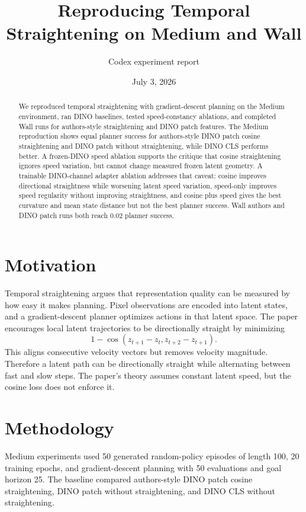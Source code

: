 \documentclass[11pt]{article}
\title{Reproducing Temporal Straightening on Medium and Wall}
\author{Codex experiment report}
\date{July 3, 2026}
\begin{document}
\maketitle

\begin{abstract}
We reproduced temporal straightening with gradient-descent planning on the Medium environment, ran DINO baselines, tested speed-constancy ablations, and completed Wall runs for authors-style straightening and DINO patch features. The Medium reproduction shows equal planner success for authors-style DINO patch cosine straightening and DINO patch without straightening, while DINO CLS performs better. A frozen-DINO speed ablation supports the critique that cosine straightening ignores speed variation, but cannot change measured frozen latent geometry. A trainable DINO-channel adapter ablation addresses that caveat: cosine improves directional straightness while worsening latent speed variation, speed-only improves speed regularity without improving straightness, and cosine plus speed gives the best curvature and mean state distance but not the best planner success. Wall authors and DINO patch runs both reach 0.02 planner success.
\end{abstract}

\section{Motivation}

Temporal straightening argues that representation quality can be measured by how easy it makes planning. Pixel observations are encoded into latent states, and a gradient-descent planner optimizes actions in that latent space. The paper encourages local latent trajectories to be directionally straight by minimizing
\[
  1 - \cos(z_{t+1} - z_t, z_{t+2} - z_{t+1}).
\]
This aligns consecutive velocity vectors but removes velocity magnitude. Therefore a latent path can be directionally straight while alternating between fast and slow steps. The paper's theory assumes constant latent speed, but the cosine loss does not enforce it.

\section{Methodology}

Medium experiments used 50 generated random-policy episodes of length 100, 20 training epochs, and gradient-descent planning with 50 evaluations and goal horizon 25. The baseline compared authors-style DINO patch cosine straightening, DINO patch without straightening, and DINO CLS without straightening.
\end{document}
